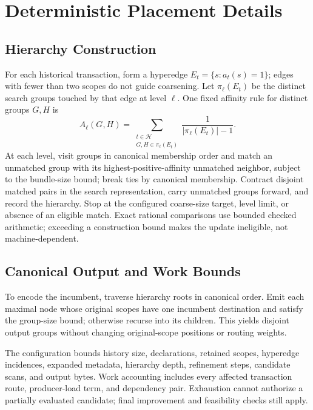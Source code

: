 \section{Deterministic Placement Details}
\label{app:placement-details}

\subsection{Hierarchy Construction}

For each historical transaction, form a hyperedge \(E_t=\{s:a_t(s)=1\}\); edges with fewer than two scopes do not guide coarsening. Let \(\pi_\ell(E_t)\) be the distinct search groups touched by that edge at level \(\ell\). One fixed affinity rule for distinct groups \(G,H\) is
\begin{equation}
 A_\ell(G,H)=
 \sum_{\substack{t\in\mathcal H\\G,H\in\pi_\ell(E_t)}}
 \frac{1}{|\pi_\ell(E_t)|-1}.
\label{eq:coarsening-affinity}
\end{equation}
At each level, visit groups in canonical membership order and match an unmatched group with its highest-positive-affinity unmatched neighbor, subject to the bundle-size bound; break ties by canonical membership. Contract disjoint matched pairs in the search representation, carry unmatched groups forward, and record the hierarchy. Stop at the configured coarse-size target, level limit, or absence of an eligible match. Exact rational comparisons use bounded checked arithmetic; exceeding a construction bound makes the update ineligible, not machine-dependent.

\subsection{Canonical Output and Work Bounds}

To encode the incumbent, traverse hierarchy roots in canonical order. Emit each maximal node whose original scopes have one incumbent destination and satisfy the group-size bound; otherwise recurse into its children. This yields disjoint output groups without changing original-scope positions or routing weights.

The configuration bounds history size, declarations, retained scopes, hyperedge incidences, expanded metadata, hierarchy depth, refinement steps, candidate scans, and output bytes. Work accounting includes every affected transaction route, producer-load term, and dependency pair. Exhaustion cannot authorize a partially evaluated candidate; final improvement and feasibility checks still apply.

